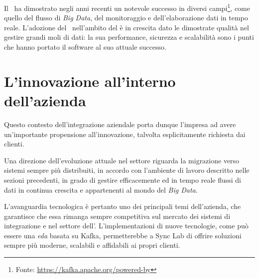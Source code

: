 Il \software\ ha dimostrato negli anni recenti un notevole successo in diversi campi\footnote{Fonte: \url{https://kafka.apache.org/powered-by}}, come quello del flusso di \textit{Big Data}, del monitoraggio e dell'elaborazione dati in tempo reale.
L'adozione del \software\ nell'ambito del  è in crescita dato le dimostrate qualità nel gestire grandi moli di dati: la sua performance, sicurezza e scalabilità sono i punti che hanno portato il software al suo attuale successo.

\section{L'innovazione all'interno dell'azienda}


Questo contesto dell'integrazione aziendale porta dunque l'impresa ad avere un'importante propensione all'innovazione, talvolta esplicitamente richiesta dai clienti.

Una direzione dell'evoluzione attuale nel settore  riguarda la migrazione verso sistemi sempre più distribuiti, in accordo con l'ambiente di lavoro descritto nelle sezioni precedenti, in grado di gestire efficacemente ed in tempo reale flussi di dati in continua crescita e appartenenti al mondo del \textit{Big Data}.

L'avanguardia tecnologica è pertanto uno dei principali temi dell'azienda, che garantisce che essa rimanga sempre competitiva sul mercato dei sistemi di integrazione e nel settore dell'.
L'implementazioni di nuove tecnologie, come può essere una \textit{\acrlong{eda}} basata su Kafka, permetterebbe a Sync Lab di offrire soluzioni sempre più moderne, scalabili e affidabili ai propri clienti.
